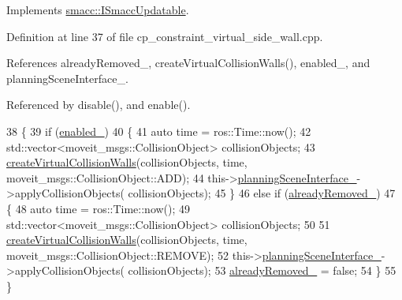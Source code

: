 Implements \hyperlink{classsmacc_1_1ISmaccUpdatable_a84ee0520cbefdb1d412bed54650b028e}{smacc\+::\+I\+Smacc\+Updatable}.



Definition at line 37 of file cp\+\_\+constraint\+\_\+virtual\+\_\+side\+\_\+wall.\+cpp.



References already\+Removed\+\_\+, create\+Virtual\+Collision\+Walls(), enabled\+\_\+, and planning\+Scene\+Interface\+\_\+.



Referenced by disable(), and enable().


\begin{DoxyCode}
38         \{
39             \textcolor{keywordflow}{if} (\hyperlink{classsm__fetch__two__table__whiskey__pour_1_1cl__move__group__interface_1_1CpConstraintVirtualSideWall_afdb21410cf37966fbdf12366ebc6dd02}{enabled\_})
40             \{
41                 \textcolor{keyword}{auto} time = ros::Time::now();
42                 std::vector<moveit\_msgs::CollisionObject> collisionObjects;
43                 \hyperlink{classsm__fetch__two__table__whiskey__pour_1_1cl__move__group__interface_1_1CpConstraintVirtualSideWall_ad4ecafb1a6c5cc8f72f04643047c0b03}{createVirtualCollisionWalls}(collisionObjects, time, 
      moveit\_msgs::CollisionObject::ADD);
44                 this->\hyperlink{classsm__fetch__two__table__whiskey__pour_1_1cl__move__group__interface_1_1CpConstraintVirtualSideWall_abc3ab168e5ab2388bf9e0107cc791387}{planningSceneInterface\_}->applyCollisionObjects(
      collisionObjects);
45             \}
46             \textcolor{keywordflow}{else} \textcolor{keywordflow}{if} (\hyperlink{classsm__fetch__two__table__whiskey__pour_1_1cl__move__group__interface_1_1CpConstraintVirtualSideWall_a9aa0925adf4664e66f5cb5235ca4eeba}{alreadyRemoved\_})
47             \{
48                 \textcolor{keyword}{auto} time = ros::Time::now();
49                 std::vector<moveit\_msgs::CollisionObject> collisionObjects;
50 
51                 \hyperlink{classsm__fetch__two__table__whiskey__pour_1_1cl__move__group__interface_1_1CpConstraintVirtualSideWall_ad4ecafb1a6c5cc8f72f04643047c0b03}{createVirtualCollisionWalls}(collisionObjects, time, 
      moveit\_msgs::CollisionObject::REMOVE);
52                 this->\hyperlink{classsm__fetch__two__table__whiskey__pour_1_1cl__move__group__interface_1_1CpConstraintVirtualSideWall_abc3ab168e5ab2388bf9e0107cc791387}{planningSceneInterface\_}->applyCollisionObjects(
      collisionObjects);
53                 \hyperlink{classsm__fetch__two__table__whiskey__pour_1_1cl__move__group__interface_1_1CpConstraintVirtualSideWall_a9aa0925adf4664e66f5cb5235ca4eeba}{alreadyRemoved\_} = \textcolor{keyword}{false};
54             \}
55         \}
\end{DoxyCode}
